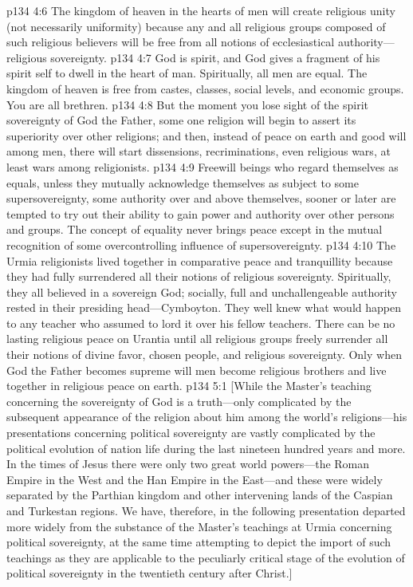 \vs p134 4:6 The kingdom of heaven in the hearts of men will create religious unity (not necessarily uniformity) because any and all religious groups composed of such religious believers will be free from all notions of ecclesiastical authority---religious sovereignty.
\vs p134 4:7 God is spirit, and God gives a fragment of his spirit self to dwell in the heart of man. Spiritually, all men are equal. The kingdom of heaven is free from castes, classes, social levels, and economic groups. You are all brethren.
\vs p134 4:8 But the moment you lose sight of the spirit sovereignty of God the Father, some one religion will begin to assert its superiority over other religions; and then, instead of peace on earth and good will among men, there will start dissensions, recriminations, even religious wars, at least wars among religionists.
\vs p134 4:9 Freewill beings who regard themselves as equals, unless they mutually acknowledge themselves as subject to some supersovereignty, some authority over and above themselves, sooner or later are tempted to try out their ability to gain power and authority over other persons and groups. The concept of equality never brings peace except in the mutual recognition of some overcontrolling influence of supersovereignty.
\vs p134 4:10 The Urmia religionists lived together in comparative peace and tranquillity because they had fully surrendered all their notions of religious sovereignty. Spiritually, they all believed in a sovereign God; socially, full and unchallengeable authority rested in their presiding head---Cymboyton. They well knew what would happen to any teacher who assumed to lord it over his fellow teachers. There can be no lasting religious peace on Urantia until all religious groups freely surrender all their notions of divine favor, chosen people, and religious sovereignty. Only when God the Father becomes supreme will men become religious brothers and live together in religious peace on earth.\plusone
{}
\vs p134 5:1 [While the Master’s teaching concerning the sovereignty of God is a truth---only complicated by the subsequent appearance of the religion about him among the world’s religions---his presentations concerning political sovereignty are vastly complicated by the political evolution of nation life during the last nineteen hundred years and more. In the times of Jesus there were only two great world powers---the Roman Empire in the West and the Han Empire in the East---and these were widely separated by the Parthian kingdom and other intervening lands of the Caspian and Turkestan regions. We have, therefore, in the following presentation departed more widely from the substance of the Master’s teachings at Urmia concerning political sovereignty, at the same time attempting to depict the import of such teachings as they are applicable to the peculiarly critical stage of the evolution of political sovereignty in the twentieth century after Christ.]
